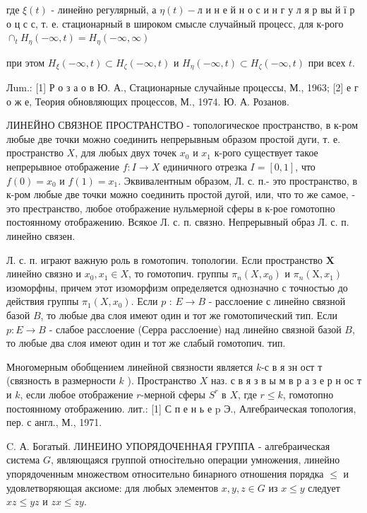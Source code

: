 \documentclass[10pt]{article}
\begin{document}
где $\xi(t)$ - линейно регулярный, а $\eta(t)-л$ и н е й н о с и н г у л я р вы й ї р о ц с с, т. е. стационарный в широком смысле случайный процесс, для к-рого $\cap_{t} H_{\eta}(-\infty, t)=H_{\eta}(-\infty, \infty)$



при этом $H_{\xi}(-\infty, t) \subset H_{\zeta}(-\infty, t)$ и $H_{\eta}(-\infty, t) \subset H_{\zeta}(-\infty, t)$ при всех $t$.



Лum.: [1] Р о з а о в Ю. А., Стационарные случайные процессы, М., 1963; [2] е г о ж е, Теория обновляющих процессов, М., 1974. Ю. А. Розанов.



ЛИНЕЙНО СВЯЗНОЕ ПРОСТРАНСТВО - топологическое пространство, в к-ром любые две точки можно соединить непрерывным образом простой дуги, т. е. пространство $X$, для любых двух точек $x_{0}$ и $x_{1}$ к-рого существует такое непрерывное отображение $f: I \rightarrow X$ единичного отрезка $I=[0,1]$, что $f(0)=x_{0}$ и $f(1)=x_{1}$. Эквивалентным образом, Л. с. п.- это пространство, в к-ром любые две точки можно соединить простой дугой, или, что то же самое, - это престранство, любое отображение нульмерной сферы в к-рое гомотопно постоянному отображению. Всякое Л. с. п. связно. Непрерывный образ Л. с. п. линейно связен.



Л. с. п. играют важную роль в гомотопич. топологии. Если пространство $\boldsymbol{X}$ линейно связно и $x_{0}, x_{1} \in X$, то гомотопич. группы $\pi_{n}\left(X, x_{0}\right)$ и $\pi_{n}\left(\mathrm{X}, x_{1}\right)$ изоморфны, причем этот изоморфизм определяется однозначно с точностью до действия группы $\pi_{1}\left(X, x_{0}\right)$. Если $p$ : $E \rightarrow B$ - расслоение с линейно связной базой $B$, то любые два слоя имеют один и тот же гомотопический тип. Если $p: E \rightarrow B$ - слабое расслоение (Серра расслоение) над линейно связной базой $B$, то любые два слоя имеют один и тот же слабый гомотопич. тип.



Многомерным обобщением линейной связности является $k$-с в я зн ост т (связность в размерности $k$ ). Пространство $X$ наз. с в я з в ы м в р а з е р н ос т и $k$, если любое отображение $r$-мерной сферы $S^{r}$ в $X$, где $r \leqslant k$, гомотопно постоянному отображению. лит.: [1] С п е н ь е p Э., Алғебраическая топология, пер. с англ., М., 1971.



C. А. Богатый. ЛИНЕИНО УПОРЯДОЧЕННАЯ ГРУППА - алгебраическая система $G$, являющаяся группой относітельно операции умножения, линейно упорядоченным множеством относительно бинарного отношения порядка $\leqslant$ и удовлетворяющая аксиоме: для любых элементов $x, y, z \in G$ из $x \leqslant y$ следует $x z \leqslant y z$ и $z x \leqslant z y$.
\end{document}
